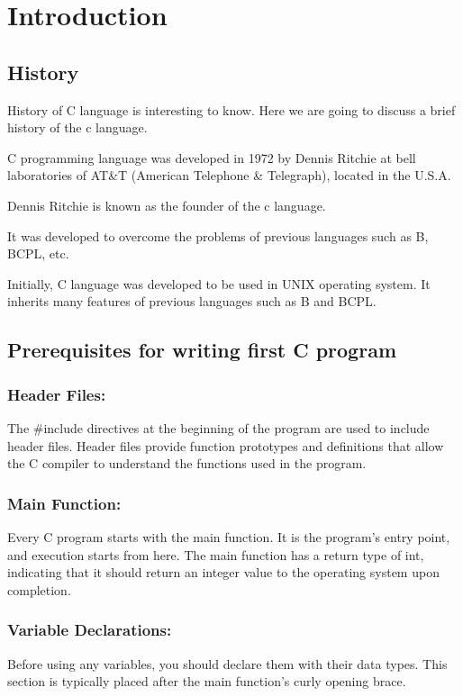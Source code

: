 \section{Introduction}
\subsection{History}
History of C language is interesting to know. Here we are going to discuss a brief history of the c language.

C programming language was developed in 1972 by Dennis Ritchie at bell laboratories of AT\&T (American Telephone \& Telegraph), located in the U.S.A.

Dennis Ritchie is known as the founder of the c language.

It was developed to overcome the problems of previous languages such as B, BCPL, etc.

Initially, C language was developed to be used in UNIX operating system. It inherits many features of previous languages such as B and BCPL.
\subsection{Prerequisites for writing first C program}

\subsubsection{Header Files:}
The \#include directives at the beginning of the program are used to include header files. Header files provide function prototypes and definitions that allow the C compiler to understand the functions used in the program.

\subsubsection{Main Function:}
Every C program starts with the main function. It is the program's entry point, and execution starts from here. The main function has a return type of int, indicating that it should return an integer value to the operating system upon completion.

\subsubsection{Variable Declarations:}
Before using any variables, you should declare them with their data types. This section is typically placed after the main function's curly opening brace.

